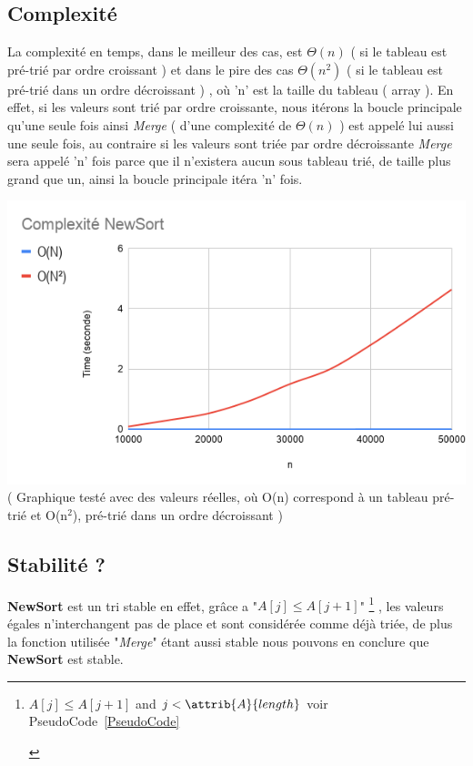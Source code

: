 \documentclass[a4paper, 11pt, oneside]{article}
\begin{document}
\subsection{Complexité}
La complexité en temps, dans le meilleur des cas, est $\Theta(n)$ ( si le tableau est pré-trié par ordre croissant ) et dans le pire des cas $\Theta(n^{2})$ ( si le tableau est pré-trié dans un ordre décroissant ) , où 'n' est la taille du tableau ( array ). En effet, si les valeurs sont trié par ordre croissante, nous itérons la boucle principale qu'une seule fois ainsi \textit{Merge} ( d'une complexité de $\Theta(n)$ ) est appelé lui aussi une seule fois, au contraire si  les valeurs sont triée par ordre décroissante \textit{Merge} sera appelé 'n' fois parce que il n'existera aucun sous tableau trié, de taille plus grand que un, ainsi la boucle principale itéra 'n' fois.     

\includegraphics[scale=0.6]{graphique.png} \\
( Graphique testé avec des valeurs réelles, où O(n) correspond à un tableau pré-trié et O(n$^{2}$), pré-trié dans un ordre décroissant ) 


\subsection{Stabilité ?}
\textbf{NewSort}
 est un tri stable en effet, grâce a "\textit{$A[j]\leq A[j+1]$}"
	\footnote{\begin{codebox}
	\While $A[j] \leq A[j+1]$ and $j < \attrib{A}{length}$
voir PseudoCode~\ref{PseudoCode}
\End
\end{codebox} }
, les valeurs égales n'interchangent pas de place et sont considérée comme déjà triée, de plus la fonction utilisée "\textit{Merge}" étant aussi stable nous pouvons en conclure que \textbf{NewSort} est stable. 
\end{document}
